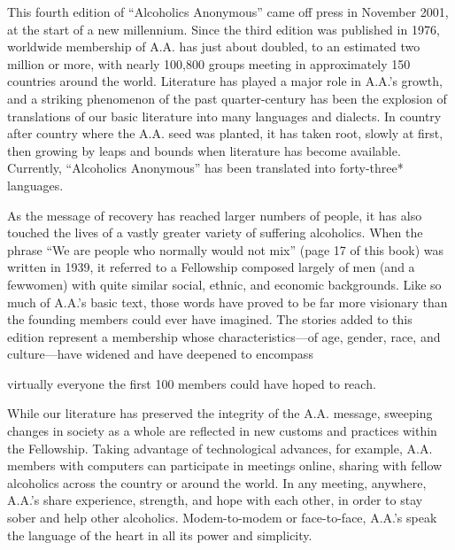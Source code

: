 This fourth edition of “Alcoholics Anonymous” came off press in November 2001, at the start of a new millennium. Since the third edition was published in 1976, worldwide membership of A.A. has just about doubled, to an estimated two million or more, with nearly 100,800 groups meeting in approximately 150 countries around the world. 
Literature has played a major role in A.A.’s growth, and a striking phenomenon of the past quarter-century has been the explosion of translations of our basic literature into many languages and dialects. 
In country after country where the A.A. seed was planted, it has taken root, slowly at first, then growing by leaps and bounds when literature has become available. 
Currently, “Alcoholics Anonymous” has been translated into forty-three* languages.

As the message of recovery has reached larger numbers of people, it has also touched the lives of a vastly greater variety of suffering alcoholics. 
When the phrase “We are people who normally would not mix” (page 17 of this book) was written in 1939, it referred to a Fellowship composed largely of men (and a fewwomen) with quite similar social, ethnic, and economic backgrounds. 
Like so much of A.A.’s basic text, those words have proved to be far more visionary than the founding members could ever have imagined. 
The stories added to this edition represent a membership whose characteristics—of age, gender, race, and culture—have widened and have deepened to encompass

virtually everyone the first 100 members could have hoped to reach.

While our literature has preserved the integrity of the A.A. message, sweeping changes in society as a whole are reﬂected in new customs and practices within the Fellowship. 
Taking advantage of technological advances, for example, A.A. members with computers can participate in meetings online, sharing with fellow alcoholics across the country or around the world. 
In any meeting, anywhere, A.A.’s share experience, strength, and hope with each other, in order to stay sober and help other alcoholics. 
Modem-to-modem or face-to-face, A.A.’s speak the language of the heart in all its power and simplicity.



